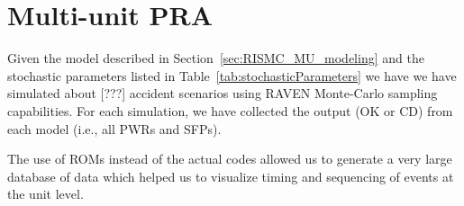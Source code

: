 \section{Multi-unit PRA}
\label{sec:multiUnitPRA}

Given the model described in Section~\ref{sec:RISMC_MU_modeling} and
the stochastic parameters listed in Table~\ref{tab:stochasticParameters} we have 
we have simulated about [???] accident scenarios using RAVEN Monte-Carlo sampling
capabilities. For each simulation, we have collected the output (OK or CD) from 
each model (i.e., all PWRs and SFPs).

The use of ROMs instead of the actual codes allowed us to generate a very large 
database of data which helped us to visualize timing and sequencing of events at 
the unit level.



